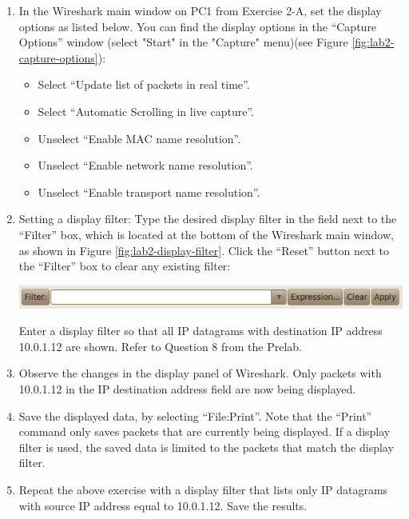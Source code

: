 \begin{enumerate}
	\item In the Wireshark main window on PC1 from Exercise 2-A, set the display options as listed below. You can find the display options in the ``Capture Options'' window (select "Start" in the "Capture" menu)(see Figure \ref{fig:lab2-capture-options}):\par
		\begin{itemize}
			\item Select ``Update list of packets in real time''.
			\item Select ``Automatic Scrolling in live capture''.
			\item Unselect ``Enable MAC name resolution''.
			\item Unselect ``Enable network name resolution''.
			\item Unselect ``Enable transport name resolution''.
		\end{itemize}
	\item Setting a display filter: Type the desired display filter in the field next to the ``Filter'' box, which is located at the bottom of the Wireshark main window, as shown in Figure \ref{fig:lab2-display-filter}. Click the ``Reset'' button next to the ``Filter'' box to clear any existing filter:\par
		\begin{minipage}{\linewidth}
			\centering
			\includegraphics[width=\linewidth]{graphics/display-filter-updated.png}
			\label{fig:lab2-display-filter}
		\end{minipage}
		Enter a display filter so that all IP datagrams with destination IP address 10.0.1.12 are shown. Refer to Question 8 from the Prelab.
	\item Observe the changes in the display panel of Wireshark. Only packets with 10.0.1.12 in the IP destination address field are now being displayed.
	\item Save the displayed data, by selecting ``File:Print''. Note that the ``Print'' command only saves packets that are currently being displayed. If a display filter is used, the saved data is limited to the packets that match the display filter.
	\item Repeat the above exercise with a display filter that lists only IP datagrams with source IP address equal to 10.0.1.12. Save the results.		
\end{enumerate}

